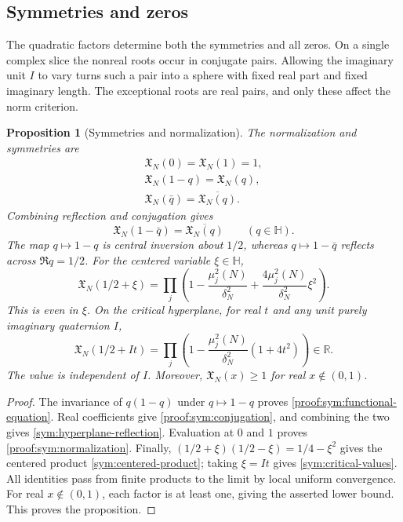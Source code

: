 \documentclass[12pt,a4paper]{amsart}
\numberwithin{equation}{section}
\def\ge{\geqslant}
\theoremstyle{plain}
\newtheorem{proposition}{Proposition}[section]
\theoremstyle{definition}
\theoremstyle{remark}
\begin{document}
\subsection{Symmetries and zeros}
\label{proof:sec:spectral-symmetry}\label{proof:v7:no-trivial-zeros}
\label{proof:v7:zero-classification}

The quadratic factors determine both the symmetries and all zeros.
On a single complex slice the nonreal roots occur in conjugate
pairs. Allowing the imaginary unit $I$ to vary turns such a pair
into a sphere with fixed real part and fixed imaginary length.
The exceptional roots are real pairs, and only these affect the
norm criterion.

\begin{proposition}[Symmetries and normalization]
\label{proof:v9:spectral-symmetries}
The normalization and symmetries are
\begin{gather}
 \mathfrak X_N(0)=\mathfrak X_N(1)=1,
       \label{proof:sym:normalization}\\
 \mathfrak X_N(1-q)=\mathfrak X_N(q),
       \label{proof:sym:functional-equation}\\
 \mathfrak X_N(\bar q)=\overline{\mathfrak X_N(q)}.
       \label{proof:sym:conjugation}
\end{gather}
Combining reflection and conjugation gives
\begin{equation}\label{sym:hyperplane-reflection}
 \mathfrak X_N(1-\bar q)=\overline{\mathfrak X_N(q)}
 \qquad(q\in\mathbb H).
\end{equation}
The map $q\mapsto1-q$ is central inversion about $1/2$, whereas
$q\mapsto1-\bar q$ reflects across $\Re q=1/2$.
For the centered variable $\xi\in\mathbb H$,
\begin{equation}\label{sym:centered-product}
 \mathfrak X_N(1/2+\xi)
 =\prod_j\left(1-\frac{\mu_j^2(N)}{\delta_N^2}
                  +\frac{4\mu_j^2(N)}{\delta_N^2}\xi^2\right).
\end{equation}
This is even in $\xi$. On the critical hyperplane, for real $t$
and any unit purely imaginary quaternion $I$,
\begin{equation}\label{sym:critical-values}
 \mathfrak X_N(1/2+It)
 =\prod_j\left(1-\frac{\mu_j^2(N)}{\delta_N^2}(1+4t^2)\right)
 \in\mathbb R.
\end{equation}
The value is independent of $I$. Moreover,
$\mathfrak X_N(x)\ge1$ for real $x\notin(0,1)$.
\end{proposition}

\begin{proof}
The invariance of $q(1-q)$ under $q\mapsto1-q$ proves
\eqref{proof:sym:functional-equation}. Real coefficients give
\eqref{proof:sym:conjugation}, and combining the two gives
\eqref{sym:hyperplane-reflection}. Evaluation at $0$ and $1$ proves
\eqref{proof:sym:normalization}. Finally,
$(1/2+\xi)(1/2-\xi)=1/4-\xi^2$ gives the centered product
\eqref{sym:centered-product}; taking $\xi=It$ gives
\eqref{sym:critical-values}. All identities pass from finite products
to the limit by local uniform convergence.
For real $x\notin(0,1)$, each factor is at least one, giving the
asserted lower bound.
This proves the proposition.
\end{proof}
\end{document}

